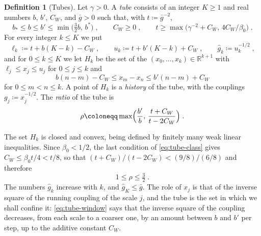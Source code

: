 \documentclass[11pt]{preprint}
\numberwithin{equation}{section}
\theoremstyle{definition}
\newtheorem{definition}[theorem]{Definition}
\theoremstyle{remark}
\theoremstyle{plain}
\begin{document}
\begin{definition}[Tubes]\label{def:tube}
Let $\gamma > 0$. A \emph{tube} consists of an integer $K \geq 1$ and real numbers $b$, $b'$, $C_W$, and $\bar g > 0$ such that, with $t \coloneqq \bar g^{-2}$,
\begin{equation}\label{eq:tube-class}
    b_* \leq b \leq b' \leq \min\bigl(\tfrac{3}{2}b,\, b^*\bigr)\;,
    \qquad
    C_W \geq 0\;,
    \qquad
    t \geq \max\bigl(\gamma^{-2} + C_W,\, 4C_W/\beta_0\bigr)\;.
\end{equation}
For every integer $k \leq K$ we put
\begin{equation}\label{eq:tube-couplings}
    \ell_k \coloneqq t + b(K - k) - C_W\;,
    \qquad
    u_k \coloneqq t + b'(K - k) + C_W\;,
    \qquad
    \hat g_k \coloneqq u_k^{-1/2}\;,
\end{equation}
and for $0 \leq k \leq K$ we let $H_k$ be the set of the $(x_0, \dots, x_k) \in \mathbb R^{k+1}$ with $\ell_j \leq x_j \leq u_j$ for $0 \leq j \leq k$ and
\begin{equation}\label{eq:tube-window}
    b(n - m) - C_W \leq x_m - x_n \leq b'(n - m) + C_W
\end{equation}
for $0 \leq m < n \leq k$. A point of $H_k$ is a \emph{history} of the tube, with the couplings $g_j \coloneqq x_j^{-1/2}$. The \emph{ratio} of the tube is
\begin{equation}\label{eq:tube-ratio}
    \rho \coloneqq \max\Bigl(\frac{b'}{b},\, \frac{t + C_W}{t - 2C_W}\Bigr)\;.
\end{equation}
\end{definition}

The set $H_k$ is closed and convex, being defined by finitely many weak linear inequalities. Since $\beta_0 < 1/2$, the last condition of \eqref{eq:tube-class} gives $C_W \leq \beta_0t/4 < t/8$, so that $(t + C_W)/(t - 2C_W) < (9/8)/(6/8)$ and therefore
\begin{equation}\label{eq:tube-ratio-bound}
    1 \leq \rho \leq \tfrac{3}{2}\;.
\end{equation}
The numbers $\hat g_k$ increase with $k$, and $\hat g_K \leq \bar g$. The role of $x_j$ is that of the inverse square of the running coupling of the scale $j$, and the tube is the set in which we shall confine it: \eqref{eq:tube-window} says that the inverse square of the coupling decreases, from each scale to a coarser one, by an amount between $b$ and $b'$ per step, up to the additive constant $C_W$.
\end{document}
